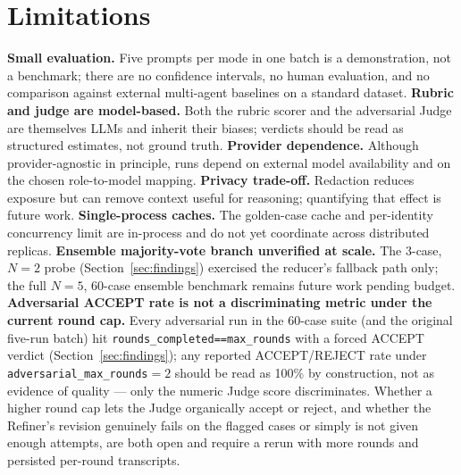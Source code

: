 \documentclass{article}
\begin{document}
\section{Limitations}
\label{sec:limitations}
\textbf{Small evaluation.} Five prompts per mode in one batch is a demonstration, not a
benchmark; there are no confidence intervals, no human evaluation, and no comparison against
external multi-agent baselines on a standard dataset.
\textbf{Rubric and judge are model-based.} Both the rubric scorer and the adversarial Judge
are themselves LLMs and inherit their biases; verdicts should be read as structured estimates,
not ground truth.
\textbf{Provider dependence.} Although provider-agnostic in principle, runs depend on external
model availability and on the chosen role-to-model mapping.
\textbf{Privacy trade-off.} Redaction reduces exposure but can remove context useful for
reasoning; quantifying that effect is future work.
\textbf{Single-process caches.} The golden-case cache and per-identity concurrency limit are
in-process and do not yet coordinate across distributed replicas.
\textbf{Ensemble majority-vote branch unverified at scale.} The 3-case, $N=2$ probe
(Section~\ref{sec:findings}) exercised the reducer's fallback path only; the full $N=5$,
60-case ensemble benchmark remains future work pending budget.
\textbf{Adversarial ACCEPT rate is not a discriminating metric under the current round cap.}
Every adversarial run in the 60-case suite (and the original five-run batch) hit
\texttt{rounds\_completed==max\_rounds} with a forced ACCEPT verdict
(Section~\ref{sec:findings}); any reported ACCEPT/REJECT rate under
\texttt{adversarial\_max\_rounds}$=2$ should be read as 100\% by construction, not as evidence
of quality --- only the numeric Judge score discriminates. Whether a higher round cap lets the
Judge organically accept or reject, and whether the Refiner's revision genuinely fails on the
flagged cases or simply is not given enough attempts, are both open and require a rerun with
more rounds and persisted per-round transcripts.
\end{document}
